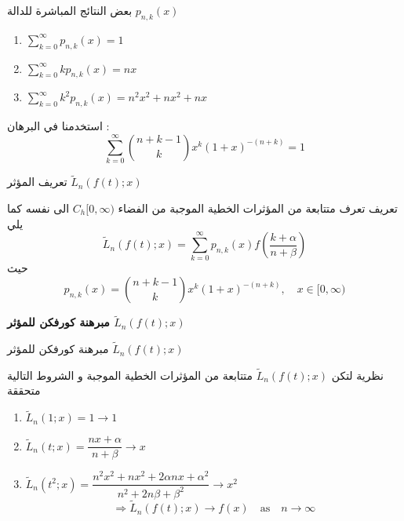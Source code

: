 	\begin{frame}
		\begin{exampleblock}{بعض النتائج المباشرة للدالة $p_{n,k}(x)$}
			\begin{english}
				\begin{enumerate}
					\item $\sum_{k=0}^{\infty} p_{n,k}(x) = 1$
					\item $\sum_{k=0}^{\infty}k p_{n,k}(x) = nx$
					\item $\sum_{k=0}^{\infty}k^2 p_{n,k}(x) = n^2 x^2 + nx^2 + nx$
				\end{enumerate}
			\end{english}
		\end{exampleblock}
		
		\pause
		استخدمنا في البرهان :
		\[
		\sum_{k=0}^{\infty} \binom{n+k-1}{k} x^k (1+x)^{-(n+k)} = 1
		\]
	\end{frame}
	\newcommand{\tL}{\tilde{L}}
	\begin{frame}{تعريف المؤثر $\tL_n(f(t);x)$}
		\begin{exampleblock}{تعريف}
			تعرف متتابعة من المؤثرات الخطية الموجبة من الفضاء $C_h[0, \infty)$ الى نفسه كما يلي
			\[
			\tL_n(f(t); x) = \sum_{k=0}^{\infty} p_{n, k}(x) f\left(\frac{k+\alpha}{n+\beta}\right)
			\]
			حيث
			\[
			p_{n,k} (x) = \binom{n+k-1}{k} x^k (1+x)^{-(n+k)}, \quad x \in [0, \infty)
			\]
		\end{exampleblock}
	\end{frame}
	
	\begin{frame}
\begin{center}
	\Huge\textbf{مبرهنة كورفكن للمؤثر $\tL_n(f(t); x)$}
\end{center}
	\end{frame}
	
	\begin{frame}{مبرهنة كورفكن للمؤثر $\tL_n(f(t); x)$}
		\begin{exampleblock}{نظرية}	
		لتكن $\tL_n(f(t);x)$ متتابعة من المؤثرات الخطية الموجبة  و الشروط التالية متحققة
		\begin{english}
			\begin{enumerate}
				\item $\tL_n(1;x)=1 \to 1$
				\item $\tL_n(t;x) = \dfrac{nx + \alpha}{n + \beta} \to x$
				\item $\tL_n(t^2;x) = \dfrac{n^2x^2 + nx^2 + 2\alpha n x + \alpha^2}{n^2 + 2n\beta+ \beta^2} \to x^2$
				\[
				\Rightarrow\tL_n(f(t);x) \to f(x) \quad\text{as}\quad n\to \infty
				\]
			\end{enumerate}
		\end{english}
		\end{exampleblock}
	\end{frame}
	
